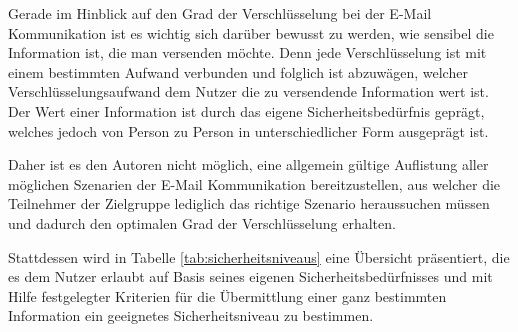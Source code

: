 \documentclass  [paper=a4,
				fontsize=12pt,
				listof=totoc,
				bibliography=totoc
				]{scrreprt}
\begin{document}
	
	
		
		Gerade im Hinblick auf den Grad der Verschlüsselung bei der E-Mail Kommunikation ist es wichtig sich darüber bewusst zu werden, wie sensibel die Information ist, die man versenden möchte. Denn jede Verschlüsselung ist mit einem bestimmten Aufwand verbunden und folglich ist abzuwägen, welcher Verschlüsselungsaufwand dem Nutzer die zu versendende Information wert ist. 
		\medskip\\
		
	
	
		Der Wert einer Information ist durch das eigene Sicherheitsbedürfnis geprägt, welches jedoch von Person zu Person in unterschiedlicher Form ausgeprägt ist.
		
		Daher ist es den Autoren nicht möglich, eine allgemein gültige Auflistung aller möglichen Szenarien der E-Mail Kommunikation bereitzustellen, aus welcher die Teilnehmer der Zielgruppe lediglich das richtige Szenario heraussuchen müssen und dadurch den optimalen Grad der Verschlüsselung erhalten. 
		
		Stattdessen wird in Tabelle \ref{tab:sicherheitsniveaus} eine Übersicht präsentiert, die es dem Nutzer erlaubt auf Basis seines eigenen Sicherheitsbedürfnisses und mit Hilfe festgelegter Kriterien für die Übermittlung einer ganz bestimmten Information ein geeignetes Sicherheitsniveau zu bestimmen. 
		\medskip\\
		
		
	
\end{document}
